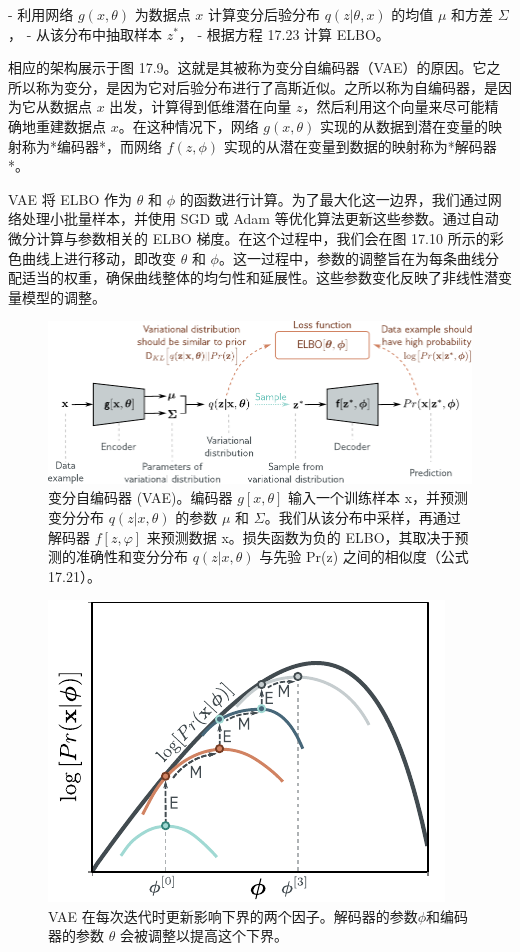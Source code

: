 \documentclass[lang=cn,newtx,10pt,scheme=chinese]{elegantbook}
\begin{document}
- 利用网络 \(g(x, \theta)\) 为数据点 \(x\) 计算变分后验分布 \(q(z|\theta, x)\) 的均值 \(\mu\) 和方差 \(\Sigma\)，
- 从该分布中抽取样本 \(z^*\)，
- 根据方程 17.23 计算 ELBO。

相应的架构展示于图 17.9。这就是其被称为变分自编码器（VAE）的原因。它之所以称为变分，是因为它对后验分布进行了高斯近似。之所以称为自编码器，是因为它从数据点 \(x\) 出发，计算得到低维潜在向量 \(z\)，然后利用这个向量来尽可能精确地重建数据点 \(x\)。在这种情况下，网络 \(g(x, \theta)\) 实现的从数据到潜在变量的映射称为*编码器*，而网络 \(f(z, \phi)\) 实现的从潜在变量到数据的映射称为*解码器*。

VAE 将 ELBO 作为 \(\theta\) 和 \(\phi\) 的函数进行计算。为了最大化这一边界，我们通过网络处理小批量样本，并使用 SGD 或 Adam 等优化算法更新这些参数。通过自动微分计算与参数相关的 ELBO 梯度。在这个过程中，我们会在图 17.10 所示的彩色曲线上进行移动，即改变 \(\theta\) 和 \(\phi\)。这一过程中，参数的调整旨在为每条曲线分配适当的权重，确保曲线整体的均匀性和延展性。这些参数变化反映了非线性潜变量模型的调整。

\begin{figure}[ht!]
\centering
\includegraphics[width=0.7\linewidth]{PDFFigures/UDLChap17PDF/VAEArch.pdf}
\caption{变分自编码器 (VAE)。编码器 \(g[x, \theta]\) 输入一个训练样本 x，并预测变分分布 \(q(z|x, \theta)\) 的参数 \(\mu\) 和 \(\Sigma\)。我们从该分布中采样，再通过解码器 \(f[z, \varphi]\) 来预测数据 x。损失函数为负的 ELBO，其取决于预测的准确性和变分分布 \(q(z|x, \theta)\) 与先验 Pr(z) 之间的相似度（公式 17.21）。}
\end{figure}


\begin{figure}[ht!]
\centering
\includegraphics[width=0.7\linewidth]{PDFFigures/UDLChap17PDF/VAEEMOpt.pdf}
\caption{VAE 在每次迭代时更新影响下界的两个因子。解码器的参数\(\phi\)和编码器的参数 \(\theta\) 会被调整以提高这个下界。}
\end{figure}
\end{document}
